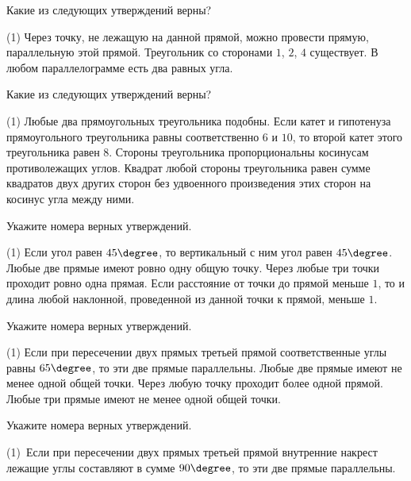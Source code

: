 %
%

\begin{class}[number=1]
	\begin{listofex}
		\item Какие из следующих утверждений верны?
		\begin{tasks}(1)
			\task Через точку, не лежащую на данной прямой, можно провести прямую, параллельную этой
			прямой.
			\task Треугольник со сторонами \( 1 \), \( 2 \), \( 4 \) существует.
			\task В любом параллелограмме есть два равных угла.
		\end{tasks}
		\item Какие из следующих утверждений верны?
		\begin{tasks}(1)
			\task Любые два прямоугольных треугольника подобны.
			\task Если катет и гипотенуза прямоугольного треугольника равны соответственно \( 6 \) и \( 10 \), то второй катет этого треугольника равен \( 8 \).
			\task Стороны треугольника пропорциональны косинусам противолежащих углов.
			\task Квадрат любой стороны треугольника равен сумме квадратов двух других сторон без удвоенного произведения этих сторон на косинус угла между ними.
		\end{tasks}	
	\item Укажите номера верных утверждений.
	\begin{tasks}(1)
		\task Если угол равен \( 45\degree \), то вертикальный с ним угол равен \( 45\degree \).
		\task Любые две прямые имеют ровно одну общую точку.
		\task Через любые три точки проходит ровно одна прямая.
		\task Если расстояние от точки до прямой меньше \( 1 \), то и длина любой наклонной, проведенной из данной точки к прямой, меньше \( 1 \).
	\end{tasks}
	\item Укажите номера верных утверждений.
	\begin{tasks}(1)
		\task Если при пересечении двух прямых третьей прямой соответственные углы равны \( 65\degree \), то эти две прямые параллельны.
		\task Любые две прямые имеют не менее одной общей точки.
		\task Через любую точку проходит более одной прямой.
		\task Любые три прямые имеют не менее одной общей точки.
	\end{tasks}
	\item Укажите номера верных утверждений.
	\begin{tasks}(1)
		\task  Если при пересечении двух прямых третьей прямой внутренние накрест лежащие углы составляют в сумме \( 90\degree \), то эти две прямые параллельны.

\end{tasks}
\end{listofex}
\end{class}
